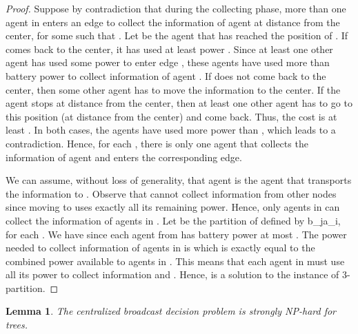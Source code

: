 \documentclass{article}
\newtheorem{lemma}{Lemma}
\begin{document}
\begin{proof}
Suppose by contradiction that during the collecting phase, more than one agent in  enters an edge  to collect the information of agent  at distance  from the center, for some  such that .
Let  be the agent that has reached the position of . If  comes back to the center, it has used at least power  . Since at least one other agent has used some power to enter edge , these agents have used more than  battery power to collect information of agent . If  does not come back to the center, then some other agent has to move the information to the center. If the agent  stops at distance  from the center, then at least one other agent has to go to this position (at distance  from the center) and come back. Thus, the cost is at least . In both cases, the agents have used more power than , which leads to a contradiction. Hence, for each , there is only one agent that collects the information of agent  and enters the corresponding edge. 

We can assume, without loss of generality, that agent  is the agent that transports the information to . Observe that  cannot collect information from other nodes since moving to  uses exactly all its remaining power. Hence, only agents in  can collect the information of agents in . Let  be the partition of  defined by b_ja_i, for each . We have  since each agent from  has battery power at most . The power needed to collect information of agents in  is  which is exactly equal to the combined power available to agents in  . This means that each agent in   must use all its power to collect information and . Hence,  is a solution to the instance of 3-partition. 
\end{proof}


\begin{lemma}\label{th:NP-hard-graph-b}
The centralized broadcast decision problem is strongly NP-hard for trees.  
\end{lemma}
\end{document}
